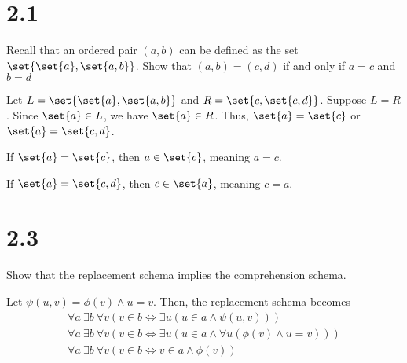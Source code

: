 \documentclass[10pt]{mypackage}
\begin{document}
\RaggedRight
\section{2.1}%
\begin{problem}
  \normalsize
  Recall that an ordered pair $(a,b)$ can be defined as the set $\set{\set{a},\set{a,b}}$. Show that $(a,b) = (c,d)$ if and only if $a=c$ and $b=d$
\end{problem}
\begin{solution}
  Let $L = \set{\set{a},\set{a,b}}$ and $R = \set{c,\set{c,d}}$. Suppose $L = R$. Since $\set{a}\in L$, we have $\set{a}\in R$. Thus, $\set{a} = \set{c}$ or $\set{a} = \set{c,d}$.
  \begin{description}[leftmargin=0pt]
    \item[Case 1:] If $\set{a} = \set{c}$, then $a\in \set{c}$, meaning $a = c$.
    \item[Case 2:] If $\set{a} = \set{c,d}$, then $c\in \set{a}$, meaning $c = a$.
  \end{description}
\end{solution}
\section{2.3}%
\begin{problem}
  Show that the replacement schema implies the comprehension schema.
\end{problem}
\begin{solution}
  Let $\psi(u,v) = \phi(v) \wedge u = v$. Then, the replacement schema becomes
  \begin{align*}
    \forall a\: \exists b\:\forall v\left(v\in b \Leftrightarrow \exists u\left(u\in a \wedge \psi(u,v)\right)\right)\\
    \forall a\: \exists b \:\forall v \left(v\in b \Leftrightarrow \exists u \left(u\in a \wedge \forall u\left(\phi(v) \wedge u = v\right)\right)\right)\\
    \forall a\:\exists b \: \forall v \left(v\in b \Leftrightarrow v\in a \wedge \phi(v)\right)
  \end{align*}
\end{solution}
\end{document}
